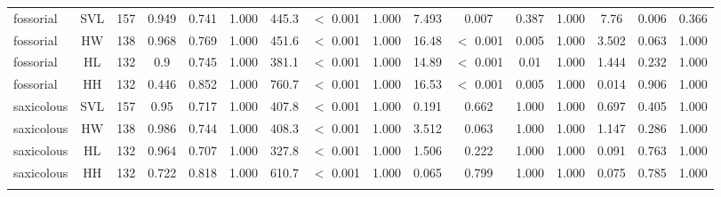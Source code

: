 \begin{longtable}{lccccccccccccccc}
fossorial & SVL & 157 & 0.949 & 0.741 & 1.000 & 445.3 & $<$ 0.001 & 1.000 & 7.493 & 0.007 & 0.387 & 1.000 & 7.76 & 0.006 & 0.366 \\ 
fossorial & HW & 138 & 0.968 & 0.769 & 1.000 & 451.6 & $<$ 0.001 & 1.000 & 16.48 & $<$ 0.001 & 0.005 & 1.000 & 3.502 & 0.063 & 1.000 \\ 
fossorial & HL & 132 & 0.9 & 0.745 & 1.000 & 381.1 & $<$ 0.001 & 1.000 & 14.89 & $<$ 0.001 & 0.01 & 1.000 & 1.444 & 0.232 & 1.000 \\ 
fossorial & HH & 132 & 0.446 & 0.852 & 1.000 & 760.7 & $<$ 0.001 & 1.000 & 16.53 & $<$ 0.001 & 0.005 & 1.000 & 0.014 & 0.906 & 1.000 \\ 
saxicolous & SVL & 157 & 0.95 & 0.717 & 1.000 & 407.8 & $<$ 0.001 & 1.000 & 0.191 & 0.662 & 1.000 & 1.000 & 0.697 & 0.405 & 1.000 \\ 
saxicolous & HW & 138 & 0.986 & 0.744 & 1.000 & 408.3 & $<$ 0.001 & 1.000 & 3.512 & 0.063 & 1.000 & 1.000 & 1.147 & 0.286 & 1.000 \\ 
saxicolous & HL & 132 & 0.964 & 0.707 & 1.000 & 327.8 & $<$ 0.001 & 1.000 & 1.506 & 0.222 & 1.000 & 1.000 & 0.091 & 0.763 & 1.000 \\ 
saxicolous & HH & 132 & 0.722 & 0.818 & 1.000 & 610.7 & $<$ 0.001 & 1.000 & 0.065 & 0.799 & 1.000 & 1.000 & 0.075 & 0.785 & 1.000 \\ 
\hline

\label{table_main_results}
\end{longtable}


